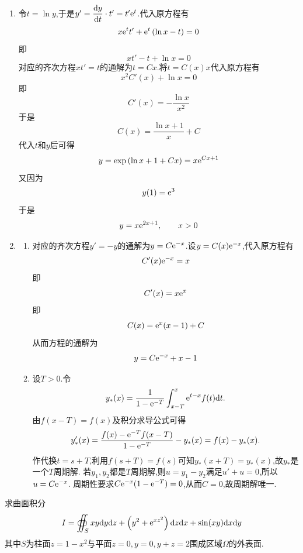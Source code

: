 \documentclass{ctexart}
\begin{document}
\begin{solution}
    \begin{enumerate}[label=\tbf{(\arabic*)}]
        \item 令$t=\ln y$,于是$y'=\dfrac{\mathrm{d} y}{\mathrm{d} t}\cdot t'=t'\mathrm{e}^t$.代入原方程有
            \[x\mathrm{e}^t t'+\mathrm{e}^t\left(\ln x-t\right)=0\]
            即
            \[xt'-t+\ln x=0\]
            对应的齐次方程$xt'=t$的通解为$t=Cx$.将$t=C(x)x$代入原方程有
            \[x^2C'(x)+\ln x=0\]
            即
            \[C'(x)=-\dfrac{\ln x}{x^2}\]
            于是
            \[C(x)=\dfrac{\ln x+1}{x}+C\]
            代入$t$和$y$后可得
            \[y=\exp\left(\ln x+1+Cx\right)=x\mathrm{e}^{Cx+1}\]
            又因为
            \[y(1)=\mathrm{e}^3\]
            于是
            \[y=x\mathrm{e}^{2x+1},\qquad x>0\]
        \item 
            \begin{enumerate}[label=\tbf{(\alph*)}]
                \item 对应的齐次方程$y'=-y$的通解为$y=C\mathrm{e}^{-x}$.设$y=C(x)\mathrm{e}^{-x}$,代入原方程有
                    \[C'(x)\mathrm{e}^{-x}=x\]
                    即
                    \[C'(x)=x\mathrm{e}^x\]
                    即
                    \[C(x)=\mathrm{e}^x(x-1)+C\]
                    从而方程的通解为
                    \[y=C\mathrm{e}^{-x}+x-1\]

                \item 设$T>0$.令
                    \[y_*(x)=\dfrac{1}{1-\mathrm{e}^{-T}}\int_{x-T}^x\mathrm{e}^{t-x}f(t)\mathrm{d} t.\]
                    由$f(x-T)=f(x)$及积分求导公式可得
                    \[y_*'(x)=\dfrac{f(x)-\mathrm{e}^{-T}f(x-T)}{1-\mathrm{e}^{-T}}-y_*(x)=f(x)-y_*(x).\]
                    作代换$t=s+T$,利用$f(s+T)=f(s)$可知$y_*(x+T)=y_*(x)$,故$y_*$是一个$T$周期解.
                    若$y_1,y_2$都是$T$周期解,则$u=y_1-y_2$满足$u'+u=0$,所以$u=C\mathrm{e}^{-x}$.
                    周期性要求$C\mathrm{e}^{-x}(1-\mathrm{e}^{-T})=0$,从而$C=0$,故周期解唯一.
            \end{enumerate}
    \end{enumerate}  
\end{solution}
\begin{problem}[5.(10\songti{分})]
    求曲面积分
    \[I=\oiint_{S}xy\mathrm{d} y\mathrm{d} z+\left(y^2+\mathrm{e}^{xz^2}\right)\mathrm{d} z\mathrm{d} x+\sin(xy)\mathrm{d} x\mathrm{d} y\]
    其中$S$为柱面$z=1-x^2$与平面$z=0,y=0,y+z=2$围成区域$\Omega$的外表面.
\end{problem}
\end{document}
